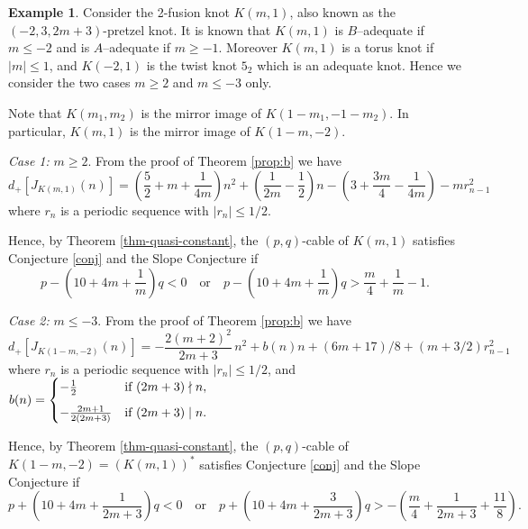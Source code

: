 \documentclass[11pt]{amsart}
\theoremstyle{definition}
\newtheorem{example}[theorem]{Example}
\newcommand{\K}{{K_{p, q}}}
\newcommand\no[1]{}
\begin{document}
\begin{example} 
\label{example-pretzel}
Consider the 2-fusion knot $K(m, 1)$, also known as the $(-2,3,2m+3)$-pretzel knot. It is known that $K(m,1)$ is $B$--adequate if $m \le -2$ and is $A$--adequate if $m \ge -1$. Moreover $K(m,1)$ is a torus knot if $|m| \le 1$, and $K(-2,1)$ is the twist knot $5_2$ which is an adequate knot. Hence we consider the two cases $m \ge 2$ and $m \le -3$ only. 

Note that $K(m_1,m_2)$ is the mirror image of $K(1-m_1, -1-m_2)$. In particular, $K(m,1)$ is the mirror image of $K(1-m, -2)$.

\textit{Case 1:} $m \ge 2$. From the proof of Theorem \ref{prop:b} we have
$$
d_+[J_{K(m, 1)}(n)] = \left( \frac{5}{2} + m + \frac{1}{4m} \right) n^2 + \left( \frac{1}{2m} - \frac{1}{2} \right) n - \left( 3 + \frac{3m}{4} - \frac{1}{4m} \right) - m r^2_{n-1}
$$
where $r_n$ is a periodic sequence with $|r_n| \le 1/2$.

Hence, by Theorem \ref{thm-quasi-constant}, the $(p,q)$-cable of $K(m,1)$ satisfies Conjecture \ref{conj} and the Slope Conjecture if $$p-\left( 10 + 4m + \frac{1}{m} \right)q <0 \quad \text{or} \quad p-\left( 10+ 4m + \frac{1}{m} \right)q > \frac{m}{4} + \frac{1}{m} - 1.$$

\textit{Case 2:} $m \le -3$. From the proof of Theorem \ref{prop:b} we have
$$d_+[J_{K(1-m, -2)}(n)] = -\frac {2(m+2)^2} {2m+3} \, n^2 + b(n) n + (6m+17)/8 + (m + 3/2) r^2_{n-1}$$
where $r_n$ is a periodic sequence with $|r_n| \le 1/2$, and $b(n) = \begin{cases} -\frac{1}{2}   &\mbox{if } (2m+3) \nmid n, \medskip \\ 
-\frac {2m+1} {2( 2m+3)} & \mbox{if } (2m+3) \mid n. \end{cases}$

\smallskip

Hence, by Theorem \ref{thm-quasi-constant}, the $(p,q)$-cable of $K(1-m, -2) = (K(m,1))^*$ satisfies Conjecture \ref{conj} and the Slope Conjecture if $$p + \left( 10 + 4m + \frac{1}{2m + 3} \right)q < 0 \quad \text{or} \quad p + \left( 10+ 4m + \frac{3}{2m+3} \right)q > - \left( \frac{m}{4} + \frac{1}{2m+3}+ \frac{11}{8} \right).$$
\end{example}

 

\no{ Similarly, let $K$ be a knot such that for $n \gg 0$ we have
$$
d_-[J_K(n)]=a^*n^2+b^*(n)n+d^*(n)
$$
where $a^*$ is a constant, $b^*(n)$ and $d^*(n)$ are periodic functions, and $b^*(n) \ge 0$. Let
\begin{eqnarray*}
M^*_1 &=&  \max\{|b^*(i)-b^*(j)|\},\\
M^*_2 &=& \max\{-2b^*(i) + |b^*(i) - b^*(j)| +|d^*(i)-d^*(j)|\}.
\end{eqnarray*}

Suppose $p - (4a^* + M^*_1)q > 0$, or $p - (4a^* - M^*_1)q < - M^*_2$ and $p - 4a^*q <0$. Then for $n \gg 0$ we have
$$d_-[J_{\K}(n)]=A^*n^2+B^*(n)n+D^*(n)$$
where $A^*$ is a constant, and $B^*(n), D^*(n)$ are periodic functions, and $B^*(n) \ge 0$. Moreover, if $js^*_K \subset bs_K$ then $js^*_{\K} \subset bs_{\K}$.
}
 


 
\end{document}
